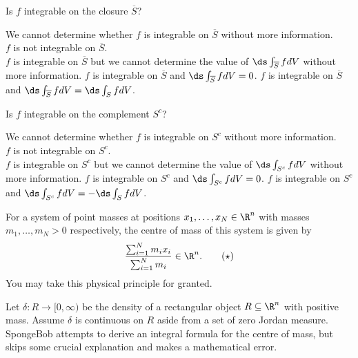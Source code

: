 \documentclass{exam}
\begin{document}
\begin{questions}
\begin{parts}
	\item Is $f$ integrable on the closure $\overline{S}$?\\[-3pt]
	\begin{checkboxes}
		\choice We cannot determine whether $f$ is integrable on $\overline{S}$ without more information.  \\[-3pt]
		\choice $f$ is not integrable on $\overline{S}$.\\[-3pt]
		\choice $f$ is integrable on $\overline{S}$ but we cannot determine the value of $\ds\int_{\overline{S}} f dV$ without more information. 	
		\choice $f$ is integrable on $\overline{S}$ and $\ds\int_{\overline{S}} f dV =0$.
		\CorrectChoice $f$ is integrable on $\overline{S}$ and $\ds\int_{\overline{S}} f dV = \ds\int_S fdV$.
	\end{checkboxes}
	\medskip

	\item Is $f$ integrable on the complement $S^c$?\\[-3pt]
	\begin{checkboxes}
		\CorrectChoice We cannot determine whether $f$ is integrable on $S^c$ without more information.  \\[-3pt]
		\choice $f$ is not integrable on $S^c$.\\[-3pt]
		\choice $f$ is integrable on $S^c$ but we cannot determine the value of $\ds\int_{S^c} f dV$ without more information. 	
		\choice $f$ is integrable on $S^c$ and $\ds\int_{S^c} f dV = 0$.
		\choice $f$ is integrable on $S^c$ and $\ds\int_{S^c} f dV = - \ds\int_S fdV$.
	\end{checkboxes}
	
\end{parts}

 

\pagebreak
\question \label{CentreMass} 
For a system of point masses at positions $x_1,\dots,x_N \in \R^n$ with masses $m_1,\dots,m_N > 0$ respectively, the centre of mass of this system is given by 
\begin{equation}
\frac{\sum_{i=1}^N m_i x_i }{\sum_{i=1}^N m_i} \in \R^n. 
	\tag{$\star$}
	\label{Principle}
\end{equation}
You may take this physical principle for granted. 


Let $\delta :R \to [0,\infty)$ be the density of a rectangular object $R \subseteq \R^n$ with positive mass. Assume $\delta$ is continuous on $R$ aside from a set of zero Jordan measure. SpongeBob attempts to derive an integral formula for the centre of mass, but skips some crucial explanation and makes a mathematical error. 


\end{questions}
\end{document}
